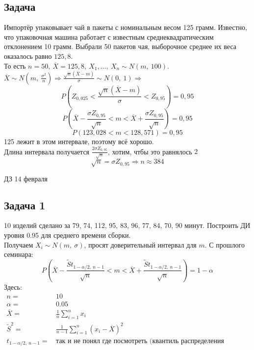 \documentclass[12pt, a4paper]{article}
\begin{document}
\subsection*{Задача}
Импортёр упаковывает чай в пакеты с номинальным весом 125 грамм. Известно, что упаковочная машина работает с известным среднеквадратическим отклонением 10 грамм. Выбрали 50 пакетов чая, выборочное среднее их веса оказалось равно $125,8$.\\
То есть $n = 50,\ \overline{X} = 125,8,\ X_1,\dots,\ X_n \sim N(m,\ 100)$.\\
$\overline{X} \sim N\left(m,\ \frac{\sigma^2}{n}\right)\Rightarrow \frac{\sqrt{n} (\overline{X} - m)}{\sigma} \sim N(0,\ 1)\Rightarrow$
\[P\left( Z_{0,025} < \frac{\sqrt{n}(\overline{X} - m)}{\sigma} < Z_{0,95} \right) = 0,95\]
\[P\left( \overline{X} - \frac{\sigma Z_{0,95}}{\sqrt{n}} < m < \overline{X} + \frac{\sigma Z_{0,95}}{\sqrt{n}} \right) = 0,95\]
\[P(123,028 < m < 128,571) = 0,95\]
125 лежит в этом интервале, поэтому всё хорошо.\\
Длина интервала получается $\frac{2\sigma Z_{0,95}}{\sqrt{n}}$, хотим, чтбы это равнялось $2$
\[\sqrt{n} = \sigma Z_{0,95} \Rightarrow n \approx 384\]
\begin{center}
    ДЗ 14 февраля
\end{center}
\subsection*{Задача 1}
10 изделий сделано за 79, 74, 112, 95, 83, 96, 77, 84, 70, 90 минут. Построить ДИ уровня 0.95 для среднего времени сборки.\\
Получаем $X_i \sim N(m,\ \sigma)$, просят доверительный интервал для $m$. С прошлого семинара:
\[P\left( \overline{X} - \frac{\tilde S t_{1 - \alpha/2,\ n - 1}}{\sqrt{n}} < m < \overline{X} + \frac{\tilde S t_{1 - \alpha/2,\ n - 1}}{\sqrt{n}} \right) = 1 - \alpha\]
Здесь:
\begin{equation*}
    \begin{aligned}
        n =                        & \, 10                                                                      \\
        \alpha =                   & \, 0.05                                                                    \\
        \overline{X} =             & \, \frac{1}{n} \sum_{i = 1}^{n} x_i                                        \\
        \tilde S^2 =               & \, \frac{1}{n - 1}\sum_{i = 1}^{n} (x_i - \overline{X})^2                  \\
        t_{1 - \alpha/2,\ n - 1} = & \, \text{так и не понял где посмотреть (квантиль распределения Стьюдента)} \\
    \end{aligned}
\end{equation*}
\end{document}
